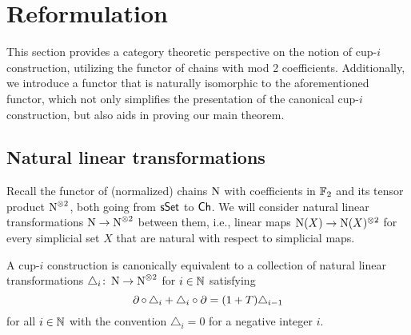 
\section{Reformulation}\label{s:reformulation}

This section provides a category theoretic perspective on the notion of cup-$i$ construction, utilizing the functor of chains with mod 2 coefficients.
Additionally, we introduce a functor that is naturally isomorphic to the aforementioned functor, which not only simplifies the presentation of the canonical cup-$i$ construction, but also aids in proving our main theorem.

\subsection{Natural linear transformations}

Recall the functor of (normalized) chains $\operatorname{N}$ with coefficients in ${\mathbb{F}_2}$ and its tensor product $\operatorname{N}^{\otimes 2}$, both going from $\mathsf{sSet}$ to $\mathsf{Ch}$.
We will consider natural linear transformations $\operatorname{N} \to \operatorname{N}^{\otimes 2}$ between them, i.e., linear maps $\operatorname{N}(X) \to \operatorname{N}(X)^{\otimes 2}$ for every simplicial set $X$ that are natural with respect to simplicial maps.

\begin{lemma}\label{l:coalgebra}
	A \mbox{cup-$i$} construction is canonically equivalent to a collection of natural linear transformations $\triangle_i \colon \operatorname{N} \to \operatorname{N}^{\otimes 2}$ for $i \in \mathbb{N}$ satisfying
	\[
	\operatorname{\partial} \circ \, \triangle_i + \triangle_i \circ \operatorname{\partial} =
	(1+T) \triangle_{i-1}
	\]
	for all $i \in \mathbb{N}$ with the convention $\triangle_{i} = 0$ for a negative integer $i$.
\end{lemma}

